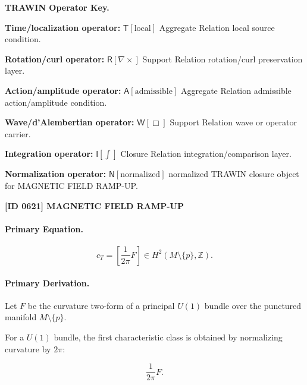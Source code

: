 \par\vspace{0.45\baselineskip}
\noindent\begin{minipage}[t]{\linewidth}
\begingroup
\small
\raggedright
\textbf{TRAWIN Operator Key.}\par
\noindent\textbf{Time/localization operator:} $\mathsf{T}\!\left[\mathrm{local}\right]$ Aggregate Relation local source condition.\par
\noindent\textbf{Rotation/curl operator:} $\mathsf{R}\!\left[\nabla\times\right]$ Support Relation rotation/curl preservation layer.\par
\noindent\textbf{Action/amplitude operator:} $\mathsf{A}\!\left[\mathrm{admissible}\right]$ Aggregate Relation admissible action/amplitude condition.\par
\noindent\textbf{Wave/d'Alembertian operator:} $\mathsf{W}\!\left[\Box\right]$ Support Relation wave or operator carrier.\par
\noindent\textbf{Integration operator:} $\mathsf{I}\!\left[\int\right]$ Closure Relation integration/comparison layer.\par
\noindent\textbf{Normalization operator:} $\mathsf{N}\!\left[\mathrm{normalized}\right]$ normalized TRAWIN closure object for MAGNETIC FIELD RAMP-UP.\par
\endgroup
\end{minipage}

\clearpage
\noindent\textbf{[ID 0621] MAGNETIC FIELD RAMP-UP}\par
\vspace{0.35em}
\paragraph{Primary Equation.}
\begin{equation}
c_T
=
\left[
\frac{1}{2\pi}F
\right]
\in
H^2(M\setminus\{p\},\mathbb{Z}) .
\end{equation}

\paragraph{Primary Derivation.}
Let $F$ be the curvature two-form of a principal $U(1)$ bundle over the punctured manifold $M\setminus\{p\}$.

For a $U(1)$ bundle, the first characteristic class is obtained by normalizing curvature by $2\pi$:

\begin{equation}
\frac{1}{2\pi}F .
\end{equation}

